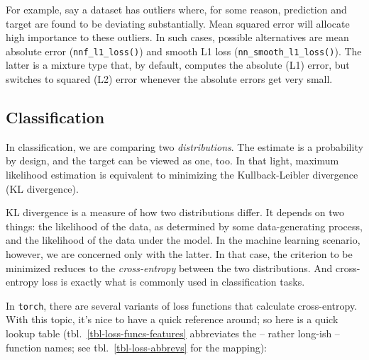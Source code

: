 \documentclass[
  letterpaper,
]{krantz}
\begin{document}
For example, say a dataset has outliers where, for some reason,
prediction and target are found to be deviating substantially. Mean
squared error will allocate high importance to these outliers. In such
cases, possible alternatives are mean absolute error
(\texttt{nnf\_l1\_loss()}) and smooth L1 loss
(\texttt{nn\_smooth\_l1\_loss()}). The latter is a mixture type that, by
default, computes the absolute (L1) error, but switches to squared (L2)
error whenever the absolute errors get very small.

\hypertarget{classification}{%
\subsection{Classification}\label{classification}}

In classification, we are comparing two \emph{distributions}. The
estimate is a probability by design, and the target can be viewed as
one, too. In that light, maximum likelihood estimation is equivalent to
minimizing the Kullback-Leibler divergence (KL divergence).

KL divergence is a measure of how two distributions differ. It depends
on two things: the likelihood of the data, as determined by some
data-generating process, and the likelihood of the data under the model.
In the machine learning scenario, however, we are concerned only with
the latter. In that case, the criterion to be minimized reduces to the
\emph{cross-entropy} between the two distributions.
And cross-entropy loss is exactly what is commonly used in
classification tasks.

In \texttt{torch}, there are several variants of loss functions that
calculate cross-entropy. With this topic, it's nice to have a quick
reference around; so here is a quick lookup table
(tbl.~\ref{tbl-loss-funcs-features} abbreviates the -- rather long-ish
-- function names; see tbl.~\ref{tbl-loss-abbrevs} for the mapping):
\end{document}
